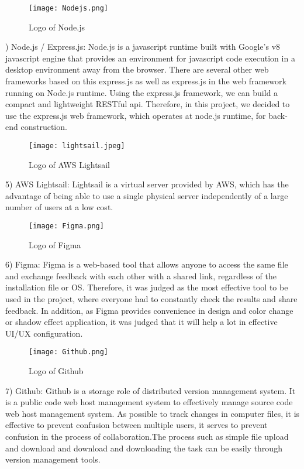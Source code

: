 \documentclass[conference]{IEEEtran}
\begin{document}
\begin{figure}[htbp]
\centerline{\texttt{[image: Nodejs.png]}}
\label{fig}
\caption{Logo of Node.js}
\end{figure}
) Node.js / Express.js: Node.js is a javascript runtime built with Google's v8 javascript engine that provides an environment for javascript code execution in a desktop environment away from the browser. There are several other web frameworks based on this express.js as well as express.js in the web framework running on Node.js runtime. Using the express.js framework, we can build a compact and lightweight RESTful api. Therefore, in this project, we decided to use the express.js web framework, which operates at node.js runtime, for back-end construction.\\

\begin{figure}[htbp]
\centerline{\texttt{[image: lightsail.jpeg]}}
\label{fig}
\caption{Logo of AWS Lightsail}
\end{figure}
5) AWS Lightsail: Lightsail is a virtual server provided by AWS, which has the advantage of being able to use a single physical server independently of a large number of users at a low cost.\\

\begin{figure}[htbp]
\centerline{\texttt{[image: Figma.png]}}
\label{fig}
\caption{Logo of Figma}
\end{figure}
6) Figma: Figma is a web-based tool that allows anyone to access the same file and exchange feedback with each other with a shared link, regardless of the installation file or OS. Therefore, it was judged as the most effective tool to be used in the project, where everyone had to constantly check the results and share feedback. In addition, as Figma provides convenience in design and color change or shadow effect application, it was judged that it will help a lot in effective UI/UX configuration.\\

\begin{figure}[htbp]
\centerline{\texttt{[image: Github.png]}}
\label{fig}
\caption{Logo of Github}
\end{figure}
7) Github: Github is a storage role of distributed version management system. It is a public code web host management system to effectively manage source code web host management system.
As possible to track changes in computer files, it is effective to prevent confusion between multiple users, it serves to prevent confusion in the process of collaboration.The process such as simple file upload and download and download and downloading the task can be easily through version management tools.\\
\end{document}
